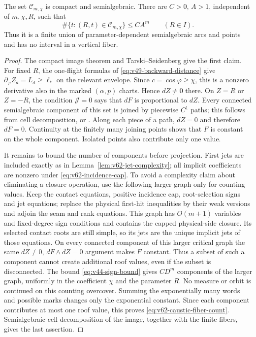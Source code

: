 \begin{theorem}
\label{thm:v62-caustic-finite}
The set $\mathcal C_{m,\chi}$ is compact and semialgebraic. There are
$C>0$, $A>1$, independent of $m,\chi,R$, such that
\begin{equation}\label{eq:v62-caustic-fiber-count}
 \#\{t:(R,t)\in\mathcal C_{m,\chi}\}\le CA^m
          \qquad(R\in I).
\end{equation}
Thus it is a finite union of parameter-dependent semialgebraic arcs
and points and has no interval in a vertical fiber.
\end{theorem}
\begin{proof}
The compact image theorem and Tarski--Seidenberg give the first claim.
For fixed $R$, the one-flight formulas of
\eqref{eq:v49-backward-distance} give
$\partial_\varphi Z_d=L_d\ge\ell_*$ on the relevant envelope.
Since $c=\cos\varphi\ge\chi$, this is a nonzero derivative also in
the marked $(\alpha,p)$ charts. Hence $dZ\ne0$ there.
On $Z=R$ or $Z=-R$, the condition $\mathcal J=0$ says that $dF$
is proportional to $dZ$. Every connected semialgebraic component of
this set is joined by piecewise $C^1$ paths; this follows from cell
decomposition, or \cite[Sections 2.3.4 and 3.2]{CosteSAG}. Along each
piece of a path, $dZ=0$ and therefore $dF=0$. Continuity at the
finitely many joining points shows that $F$ is constant on the whole
component. Isolated points also contribute only one value.

It remains to bound the number of components before projection.
First jets are included exactly as in
Lemma~\ref{lem:v62-jet-complexity}; all implicit coefficients are
nonzero under \eqref{eq:v62-incidence-cap}. To avoid a complexity claim about eliminating a closure operation,
use the following larger graph only for counting values. Keep the
contact equations, positive incidence cap, root-selection signs and
jet equations; replace the physical first-hit inequalities by their
weak versions and adjoin the seam and rank equations. This graph has
$O(m+1)$ variables and fixed-degree sign conditions and contains the
capped physical-side closure. Its selected contact roots are still
simple, so its jets are the unique implicit jets of those equations.
On every connected component of this larger critical graph the same
$dZ\ne0$, $dF\wedge dZ=0$ argument makes $F$ constant. Thus a subset
of such a component cannot create additional roof values, even if the
subset is disconnected. The bound \eqref{eq:v44-sign-bound} gives
$CD^m$ components of the larger graph, uniformly in the coefficient
$\chi$ and the parameter $R$. No measure or orbit is continued on
this counting overcover. Summing the exponentially
many words and possible marks changes only the exponential constant.
Since each component contributes at most one roof value, this proves
\eqref{eq:v62-caustic-fiber-count}. Semialgebraic cell decomposition
of the image, together with the finite fibers, gives the last assertion.
\end{proof}

